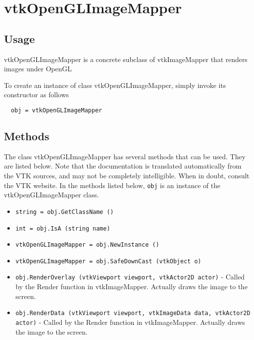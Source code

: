 \section{vtkOpenGLImageMapper}

\subsection{Usage}

 vtkOpenGLImageMapper is a concrete subclass of vtkImageMapper that
 renders images under OpenGL

To create an instance of class vtkOpenGLImageMapper, simply
invoke its constructor as follows
\begin{verbatim}
  obj = vtkOpenGLImageMapper
\end{verbatim}
\subsection{Methods}

The class vtkOpenGLImageMapper has several methods that can be used.
  They are listed below.
Note that the documentation is translated automatically from the VTK sources,
and may not be completely intelligible.  When in doubt, consult the VTK website.
In the methods listed below, \verb|obj| is an instance of the vtkOpenGLImageMapper class.
\begin{itemize}
\item  \verb|string = obj.GetClassName ()|

\item  \verb|int = obj.IsA (string name)|

\item  \verb|vtkOpenGLImageMapper = obj.NewInstance ()|

\item  \verb|vtkOpenGLImageMapper = obj.SafeDownCast (vtkObject o)|

\item  \verb|obj.RenderOverlay (vtkViewport viewport, vtkActor2D actor)| -  Called by the Render function in vtkImageMapper.  Actually draws
 the image to the screen.

\item  \verb|obj.RenderData (vtkViewport viewport, vtkImageData data, vtkActor2D actor)| -  Called by the Render function in vtkImageMapper.  Actually draws
 the image to the screen.

\end{itemize}
